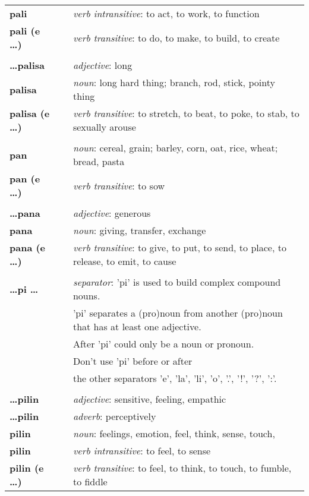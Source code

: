 \begin{supertabular}{p{2,5cm}|ll}
\textbf{pali} && \textit{verb intransitive}: to act, to work, to function \\ 
\textbf{pali (e \dots)} && \textit{verb transitive}: to do, to make, to build, to create \\ 
 && \\ %
\textbf{\dots palisa} && \textit{adjective}: long \\ 
\textbf{palisa} && \textit{noun}: long hard thing; branch, rod, stick, pointy thing \\ 
\textbf{palisa (e \dots)} && \textit{verb transitive}: to stretch, to beat, to poke, to stab, to sexually arouse \\ 
 && \\ %
\textbf{pan} && \textit{noun}: cereal, grain; barley, corn, oat, rice, wheat; bread, pasta \\ 
\textbf{pan (e \dots)} && \textit{verb transitive}: to sow \\
 && \\ %
\textbf{\dots pana} && \textit{adjective}: generous \\ 
\textbf{pana} && \textit{noun}: giving, transfer, exchange \\ 
\textbf{pana (e \dots)} && \textit{verb transitive}: to give, to put, to send, to place, to release, to emit, to cause \\ 
 && \\ %
\textbf{\dots pi \dots } && \textit{separator}: 'pi' is used to build complex compound nouns. \\ && 'pi' separates a (pro)noun from another (pro)noun that has at least one adjective. \\ && After 'pi' could only be a noun or pronoun. \\ && Don't use 'pi' before or after \\ && the other separators 'e', 'la', 'li', 'o', '.', '!', '?', ':'.  \\ 
 && \\ %
\textbf{\dots pilin} && \textit{adjective}: sensitive, feeling, empathic \\ 
\textbf{\dots pilin} && \textit{adverb}: perceptively \\ 
\textbf{pilin} && \textit{noun}: feelings, emotion, feel, think, sense, touch, \\ 
\textbf{pilin} && \textit{verb intransitive}: to feel, to sense \\ 
\textbf{pilin (e \dots)} && \textit{verb transitive}: to feel, to think, to touch, to fumble, to fiddle \\ 

\end{supertabular}
